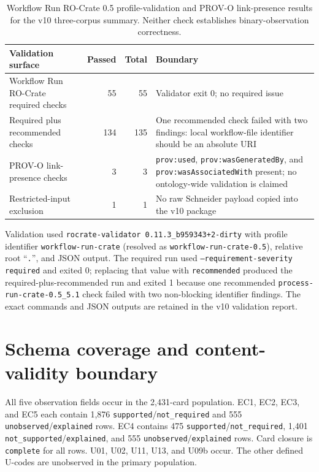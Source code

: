 \documentclass[a4paper,fleqn]{cas-dc}
\begin{document}
\begin{table}[t]
\centering
\small
\caption{Workflow Run RO-Crate 0.5 profile-validation and PROV-O link-presence results for the v10 three-corpus summary. Neither check establishes binary-observation correctness.}
\label{tab:standards_validation}
\begin{tabularx}{\textwidth}{>{\raggedright\arraybackslash}p{}rr>{\raggedright\arraybackslash}X}
\toprule
Validation surface & Passed & Total & Boundary \\
\midrule
Workflow Run RO-Crate required checks & 55 & 55 & Validator exit 0; no required issue \\
Required plus recommended checks & 134 & 135 & One recommended check failed with two findings: local workflow-file identifier should be an absolute URI \\
PROV-O link-presence checks & 3 & 3 & \texttt{prov:used}, \texttt{prov:wasGeneratedBy}, and \texttt{prov:wasAssociatedWith} present; no ontology-wide validation is claimed \\
Restricted-input exclusion & 1 & 1 & No raw Schneider payload copied into the v10 package \\
\bottomrule
\end{tabularx}
\end{table}

Validation used \texttt{rocrate-validator 0.11.3\_b959343+2-dirty} with profile identifier \texttt{workflow-run-crate} (resolved as \texttt{workflow-run-crate-0.5}), relative root ``\texttt{.}'', and JSON output. The required run used \texttt{--requirement-severity required} and exited 0; replacing that value with \texttt{recommended} produced the required-plus-recommended run and exited 1 because one recommended \texttt{process-run-crate-0.5\_5.1} check failed with two non-blocking identifier findings. The exact commands and JSON outputs are retained in the v10 validation report.

\section{Schema coverage and content-validity boundary}

All five observation fields occur in the 2{,}431-card population. EC1, EC2, EC3, and EC5 each contain 1{,}876 \texttt{supported}/\texttt{not\_required} and 555 \texttt{unobserved}/\texttt{explained} rows. EC4 contains 475 \texttt{supported}/\texttt{not\_required}, 1{,}401 \texttt{not\_supported}/\texttt{explained}, and 555 \texttt{unobserved}/\texttt{explained} rows. Card closure is \texttt{complete} for all rows. U01, U02, U11, U13, and U09b occur. The other defined U-codes are unobserved in the primary population.
\end{document}
